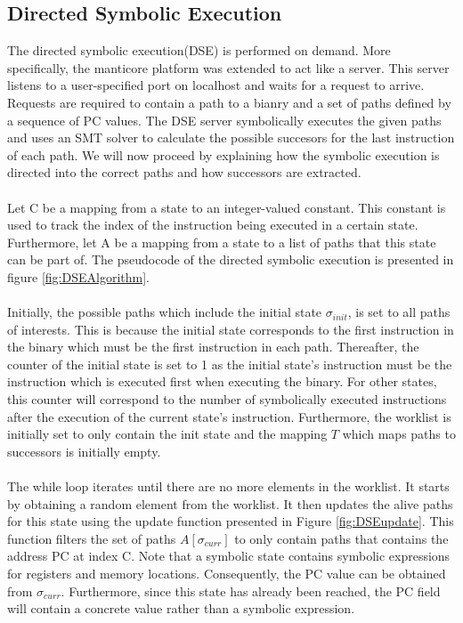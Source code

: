 \documentclass{kththesis}
\begin{document}
\subsection{Directed Symbolic Execution}
The directed symbolic execution(DSE) is performed on demand. More specifically, the manticore platform was extended to act like a server. This server listens to a user-specified port on localhost and waits for a request to arrive. Requests are required to contain a path to a bianry and a set of paths defined by a sequence of PC values. The DSE server symbolically executes the given paths and uses an SMT solver to calculate the possible succesors for the last instruction of each path. We will now proceed by explaining how the symbolic execution is directed into the correct paths and how successors are extracted.
\\ \\
Let C be a mapping from a state to an integer-valued constant. This constant is used to track the index of the instruction being executed in a certain state. Furthermore, let A be a mapping from a state to a list of paths that this state can be part of. The pseudocode of the directed symbolic execution is presented in figure \ref{fig:DSEAlgorithm}.
\\ \\
Initially, the possible paths which include the initial state $\sigma_{init}$, is set to all paths of interests. This is because the initial state corresponds to the first instruction in the binary which must be the first instruction in each path. Thereafter, the counter of the initial state is set to 1 as the initial state's instruction must be the instruction which is executed first when executing the binary. For other states, this counter will correspond to the number of symbolically executed instructions after the execution of the current state's instruction. Furthermore, the worklist is initially set to only contain the init state and the mapping $T$ which maps paths to successors is initially empty. 
\\ \\
The while loop iterates until there are no more elements in the worklist. It starts by obtaining a random element from the worklist. It then updates the alive paths for this state using the update function presented in Figure \ref{fig:DSEupdate}. This function filters the set of paths $A[\sigma_{curr}]$ to only contain paths that contains the address PC at index C. Note that a symbolic state contains symbolic expressions for registers and memory locations. Consequently, the PC value can be obtained from $\sigma_{curr}$. Furthermore, since this state has already been reached, the PC field will contain a concrete value rather than a symbolic expression.
\end{document}
